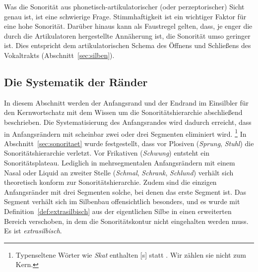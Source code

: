 Was die Sonorität aus phonetisch-artikulatorischer (oder perzeptorischer) Sicht genau ist, ist eine schwierige Frage.
Stimmhaftigkeit ist ein wichtiger Faktor für eine hohe Sonorität.
Darüber hinaus kann als Faustregel gelten, dass, je enger die durch die Artikulatoren hergestellte Annäherung ist, die Sonorität umso geringer ist.
Dies entspricht dem artikulatorischen Schema des Öffnens und Schließens des Vokaltrakts (Abschnitt~\ref{sec:silben}).

\subsection{Die Systematik der Ränder}

\label{sec:systematikderraender}

In diesem Abschnitt werden der Anfangsrand und der Endrand im Einsilbler für den Kernwortschatz mit dem Wissen um die Sonoritätshierarchie abschließend beschrieben.
Die Systematisierung des Anfangsrandes wird dadurch erreicht, dass \textipa{[S]} in Anfangsrändern mit scheinbar zwei oder drei Segmenten eliminiert wird.%
\footnote{Typenseltene Wörter wie \textit{Skat} enthalten [s] statt \textipa{[S]}.
Wir zählen sie nicht zum Kern.}
In Abschnitt~\ref{sec:sonoritaet} wurde festgestellt, dass \textipa{[S]} vor Plosiven (\textit{Sprung}, \textit{Stuhl}) die Sonoritätshierarchie verletzt.
Vor Frikativen (\textit{Schwung}) entsteht ein Sonoritätsplateau.
Lediglich in mehrsegmentalen Anfangsrändern mit einem Nasal oder Liquid an zweiter Stelle (\textit{Schmal}, \textit{Schrank}, \textit{Schlund}) verhält sich \textipa{[S]} theoretisch konform zur Sonoritätshierarchie.
Zudem sind die einzigen Anfangsränder mit drei Segmenten solche, bei denen das erste Segment \textipa{[S]} ist.
Das Segment \textipa{[S]} verhält sich im Silbenbau offensichtlich besonders, und es wurde mit Definition~\ref{def:extrasilbisch} aus der eigentlichen Silbe in einen erweiterten Bereich verschoben, in dem die Sonoritätskontur nicht eingehalten werden muss.
Es ist \textit{extrasilbisch}.

\newcommand{\Rxx}[3]{\POS[]+(#1,-1.2)\ar@{-}[#3]-(#2,1.2)}
\newcommand{\Rxxx}[4]{\POS[]+(#1,-1.2)\ar@{-}[#4]-(#2,#3)}
\newcommand{\Rxxxx}[5]{\POS[]+(#1,#2)\ar@{-}[#5]-(#3,#4)}

